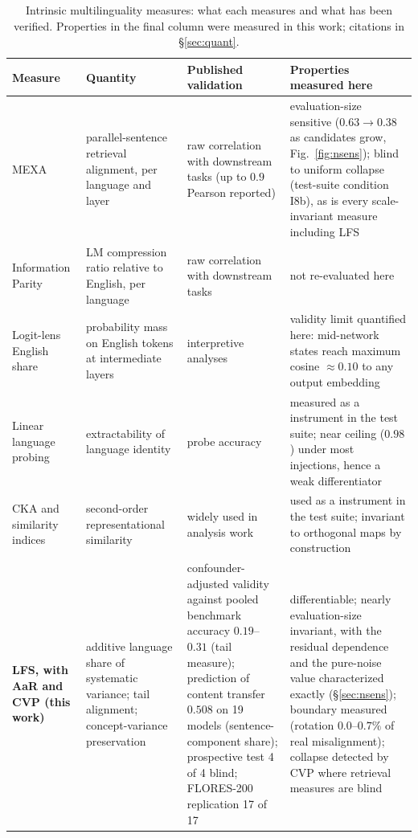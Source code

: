 \documentclass[11pt,a4paper]{article}
\begin{document}
\begin{table}[H]
\centering
\scriptsize
\caption{Intrinsic multilinguality measures: what each measures and what
has been verified. Properties in the final column were measured in this
work; citations in \S\ref{sec:quant}.}
\begin{tabular}{p{2.5cm}p{3.1cm}p{3.4cm}p{4.6cm}}
\toprule
Measure & Quantity & Published validation & Properties measured here \\
\midrule
MEXA & parallel-sentence retrieval alignment, per language and layer &
raw correlation with downstream tasks (up to $0.9$ Pearson reported) &
evaluation-size sensitive ($0.63 \to 0.38$ as candidates grow,
Fig.~\ref{fig:nsens}); blind to uniform collapse (test-suite condition I8b), as is every
scale-invariant measure including LFS \\[3pt]
Information Parity & LM compression ratio relative to English, per
language & raw correlation with downstream tasks & not re-evaluated here \\[3pt]
Logit-lens English share & probability mass on English tokens at
intermediate layers & interpretive analyses & validity limit quantified
here: mid-network states reach maximum cosine $\approx 0.10$ to any output
embedding \\[3pt]
Linear language probing & extractability of language identity & probe
accuracy & measured as a instrument in the test suite; near ceiling ($0.98$) under
most injections, hence a weak differentiator \\[3pt]
CKA and similarity indices & second-order representational similarity &
widely used in analysis work & used as a instrument in the test suite; invariant to
orthogonal maps by construction \\[3pt]
\textbf{LFS, with AaR and CVP (this work)} & additive language share of
systematic variance; tail alignment; concept-variance preservation &
confounder-adjusted validity against pooled benchmark accuracy $0.19$--$0.31$ (tail
measure); prediction of content transfer $0.508$ on 19 models (sentence-component share); prospective test 4 of 4 blind; FLORES-200 replication 17 of 17 & differentiable;
nearly evaluation-size invariant, with the residual dependence and the
pure-noise value characterized exactly (\S\ref{sec:nsens}); boundary
measured (rotation $0.0$--$0.7\%$ of
real misalignment); collapse detected by CVP where retrieval measures are
blind \\
\bottomrule
\end{tabular}
\label{tab:positioning}
\end{table}
\end{document}
